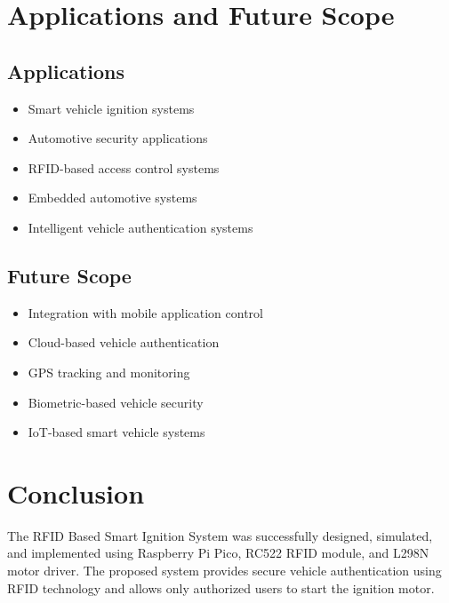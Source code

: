 \documentclass[12pt,a4paper,oneside]{report}
\begin{document}
\chapter{Applications and Future Scope}

\section{Applications}

\begin{itemize}

\item Smart vehicle ignition systems

\item Automotive security applications

\item RFID-based access control systems

\item Embedded automotive systems

\item Intelligent vehicle authentication systems

\end{itemize}

\section{Future Scope}

\begin{itemize}

\item Integration with mobile application control

\item Cloud-based vehicle authentication

\item GPS tracking and monitoring

\item Biometric-based vehicle security

\item IoT-based smart vehicle systems

\end{itemize}

\chapter{Conclusion}

The RFID Based Smart Ignition System was successfully designed, simulated, and implemented using Raspberry Pi Pico, RC522 RFID module, and L298N motor driver. The proposed system provides secure vehicle authentication using RFID technology and allows only authorized users to start the ignition motor.
\end{document}
